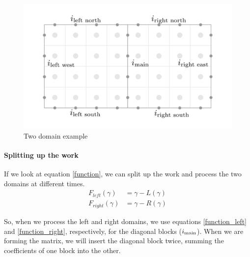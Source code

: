 \documentclass[12pt]{article}
\begin{document}
\begin{figure}[H]
    \centering
    \includegraphics[width=6in]{images/2domain.pdf}
    \caption{Two domain example}
    \label{2domain}
\end{figure}

\paragraph{Splitting up the work}

If we look at equation \ref{function}, we can split up the work and process the two domains at
different times.
\begin{align}
    F_{left}(\gamma)&=\gamma-L(\gamma) \label{function_left}\\
    F_{right}(\gamma)&=\gamma-R(\gamma) \label{function_right}
\end{align}

So, when we process the left and right domains, we use equations \eqref{function_left} and 
\eqref{function_right}, respectively, for the diagonal blocks ($i_{\textnormal{main}}$).
When we are forming the matrix, we will insert the diagonal
block twice, summing the coefficients of one block into the other.
\end{document}
